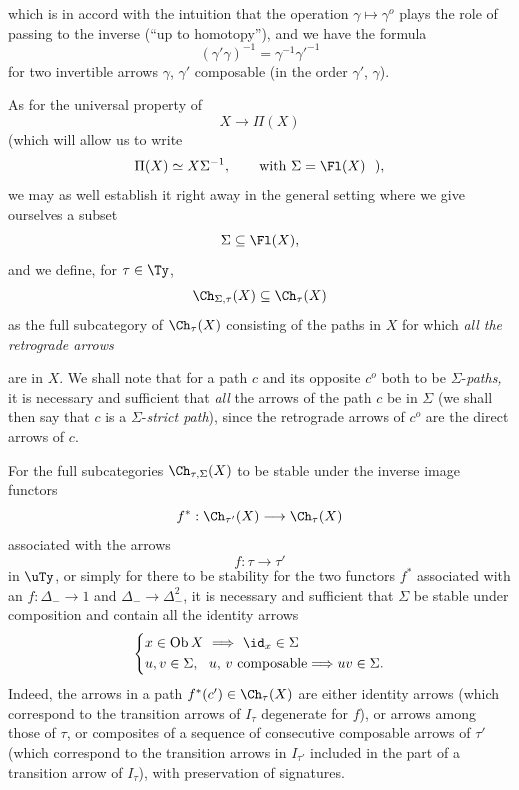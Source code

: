 
which is in accord with the intuition that the operation $\gamma \longmapsto \gamma^o$ plays the role of passing to the inverse (``up to homotopy''), and we have the formula
\[
(\gamma'\gamma)^{-1} = \gamma^{-1}\gamma'^{-1}
\]
for two invertible arrows $\gamma$, $\gamma'$ composable (in the order $\gamma'$, $\gamma$).

As for the universal property of
\[
X \longrightarrow \Pi(X)
\]
(which will allow us to write
\[
\Pi(X) \simeq X\Sigma^{-1}, \qquad \text{with } \Sigma = \Fl(X) \ \ ),
\]
we may as well establish it right away in the general setting where we give ourselves a subset
\[
\Sigma \subseteq \Fl(X),
\]
and we define, for $\tau \in \Ty$,
\[
\Ch_{\Sigma,\tau}(X) \subseteq \Ch_{\tau}(X)
\]
as the full subcategory of $\Ch_{\tau}(X)$ consisting of the paths in $X$ for which \textit{all the retrograde arrows}


are in $X$. We shall note that for a path $c$ and its opposite $c^o$ both to be $\Sigma$-\textit{paths,} it is necessary and sufficient that \textit{all} the arrows of the path $c$ be in $\Sigma$ (we shall then say that $c$ is a $\Sigma$-\textit{strict path}), since the retrograde arrows of $c^o$ are the direct arrows of $c$.

For the full subcategories $\Ch_{\tau,\Sigma}(X)$ to be stable under the inverse image functors
\[
f^* : \Ch_{\tau'}(X) \longrightarrow \Ch_{\tau}(X)
\]
associated with the arrows
\[
f : \tau \longrightarrow \tau'
\]
in $\uTy$, or simply for there to be stability for the two functors $f^*$ associated with an $f : \Delta_- \longrightarrow 1$ and $\Delta_- \longrightarrow \Delta_-^2$, it is necessary and sufficient that $\Sigma$ be stable under composition and contain all the identity arrows %
\[
\left\{
\begin{aligned}
& x \in \mathrm{Ob}\,X \ \Longrightarrow \ \id_x \in \Sigma \\
& u, v \in \Sigma, \ \ u,\, v \text{ composable} \Longrightarrow uv \in \Sigma.
\end{aligned}
\right.
\]
Indeed, the arrows in a path $f^*(c') \in \Ch_{\tau}(X)$ are either identity arrows (which correspond to the transition arrows of $I_\tau$ degenerate for $f$), or arrows among those of $\tau$, or composites of a sequence of consecutive composable arrows of $\tau'$ (which correspond to the transition arrows in $I_{\tau'}$ included in the part of a transition arrow of $I_\tau$), with preservation of signatures.

